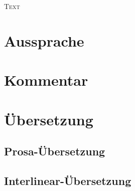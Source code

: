 \documentclass[a4paper]{article}
\begin{document}
    \setlength{\parindent}{0pt}			

	\renewcommand{\thepage}{\roman{page}} %
    \begin{center}
    	\Huge \scshape Text
    \end{center}
    
    \section{Aussprache}
		
    
    \section{Kommentar}
        

    \section{Übersetzung}
    	\subsection{Prosa-Übersetzung}
			    	
    	\subsection{Interlinear-Übersetzung}
    		
\end{document}
